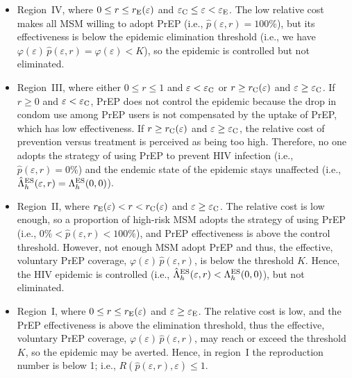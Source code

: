 \documentclass[11pt]{article}
\begin{document}
\begin{itemize}
\item Region~IV, where $0 \leq r\leq r_{\rm E}(\varepsilon)$ and $\varepsilon_{\rm C} \leq \varepsilon<\varepsilon_{\rm E}$. The low relative cost makes all MSM willing to adopt PrEP (i.e., $\hat{p}(\varepsilon,r)=100\%$), but its effectiveness is below the epidemic elimination threshold (i.e., we have $\varphi(\varepsilon) \, \hat{p}(\varepsilon,r) = \varphi(\varepsilon) < K$), so the epidemic is controlled but not eliminated.

\item Region~III, where either $ 0 \leq r \leq 1$ and $\varepsilon < \varepsilon_{\rm C}$ or $r \geq r_{\rm C}(\varepsilon)$ and $\varepsilon \geq \varepsilon_{\rm C}$. If $r \geq 0$ and $\varepsilon < \varepsilon_{\rm C}$, PrEP does not control the epidemic because the drop in condom use among PrEP users is not compensated by the uptake of PrEP, which has low effectiveness. If $r \geq r_{\rm C}(\varepsilon)$ and $\varepsilon \geq \varepsilon_{\rm C}$, the relative cost of prevention versus treatment is perceived as being too high. Therefore, no one adopts the strategy of using PrEP to prevent HIV infection (i.e., $\hat{p}(\varepsilon,r)=0\%$) and the endemic state of the epidemic stays unaffected (i.e., $\hat{\Lambda}_h^{\rm ES}(\varepsilon,r) = \Lambda_h^{\rm ES}(0,0)$). 

\item Region~II, where $r_{\rm E}(\varepsilon) < r < r_{\rm C}(\varepsilon)$ and $\varepsilon \geq \varepsilon_{\rm C}$. The relative cost is low enough, so a proportion of high-risk MSM adopts the strategy of using PrEP (i.e., $0 \%< \hat{p}(\varepsilon,r) <100\%$), and PrEP effectiveness is above the control threshold. However, not enough MSM adopt PrEP and thus, the effective, voluntary PrEP coverage, $\varphi(\varepsilon) \, \hat{p}(\varepsilon,r)$, is below the threshold $K$. Hence, the HIV epidemic is controlled (i.e., $\hat{\Lambda}_h^{\rm ES}(\varepsilon,r) < \Lambda_h^{\rm ES}(0,0)$), but not eliminated. 

\item Region~I, where $0 \leq r\leq r_{\rm E}(\varepsilon)$ and $\varepsilon \geq \varepsilon_{\rm E}$. The relative cost is low, and the PrEP effectiveness is above the elimination threshold, thus the effective, voluntary PrEP coverage, $\varphi(\varepsilon) \, \hat{p}(\varepsilon,r)$, may reach or exceed the threshold $K$, so the epidemic may be averted. Hence, in region~I the reproduction number is below 1; i.e., ${R\left(\hat{p}(\varepsilon,r),\varepsilon\right) \leq 1}$.
 \end{itemize}
\end{document}
